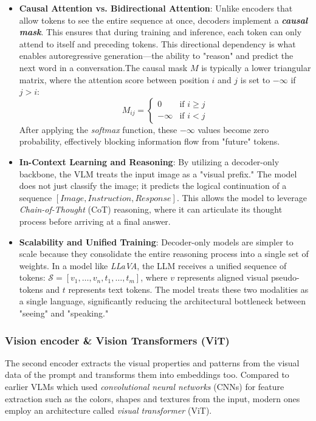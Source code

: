 \begin{itemize}
	\item \textbf{Causal Attention vs. Bidirectional Attention}: Unlike encoders that allow tokens to see the entire sequence at once, decoders implement a \textbf{\textit{causal mask}}. This ensures that during training and inference, each token can only attend to itself and preceding tokens. This directional dependency is what enables autoregressive generation—the ability to "reason" and predict the next word in a conversation.The causal mask $M$ is typically a lower triangular matrix, where the attention score between position $i$ and $j$ is set to $-\infty$ if $j > i$:
	\[ M_{ij} = \begin{cases} 0 & \text{if } i \geq j \\ -\infty & \text{if } i < j \end{cases} \]
	After applying the \textit{softmax} function, these $-\infty$ values become zero probability, effectively blocking information flow from "future" tokens.
	
	\item \textbf{In-Context Learning and Reasoning}: By utilizing a decoder-only backbone, the VLM treats the input image as a "visual prefix." The model does not just classify the image; it predicts the logical continuation of a sequence $[Image, Instruction, Response]$. This allows the model to leverage \textit{Chain-of-Thought} (CoT) reasoning, where it can articulate its thought process before arriving at a final answer.
	
	\item \textbf{Scalability and Unified Training}: Decoder-only models are simpler to scale because they consolidate the entire reasoning process into a single set of weights. In a model like \textit{LLaVA}, the LLM receives a unified sequence of tokens: $\mathcal{S} = [v_1, \dots, v_n, t_1, \dots, t_m]$, where $v$ represents aligned visual pseudo-tokens and $t$ represents text tokens. The model treats these two modalities as a single language, significantly reducing the architectural bottleneck between "seeing" and "speaking."
\end{itemize}

\subsubsection{Vision encoder \& Vision Transformers (ViT)} %
The second encoder extracts the visual properties and patterns from the visual data of the prompt and transforms them into embeddings too. Compared to earlier VLMs which used \textit{convolutional neural networks} (CNNs) for feature extraction such as the colors, shapes and textures from the input, modern ones employ an architecture called \textit{visual transformer} (ViT). 

